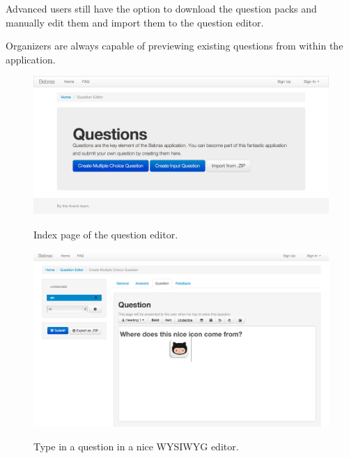 \begin{section}
\begin{subsection}
        Advanced users still have the option to download the question packs and manually
        edit them and import them to the question editor.
        
        Organizers are always capable of previewing existing questions from within the
        application.
        
        \begin{figure}[h!]
            \caption{Index page of the question editor.}
            \centering
            \includegraphics[width=1\textwidth]{img/index}
            \label{qe-index}
        \end{figure}
        
        \begin{figure}[h!]
            \caption{Type in a question in a nice WYSIWYG editor.}
            \centering
            \includegraphics[width=1\textwidth]{img/question}
            \label{qe-question}
        \end{figure}
        

\end{subsection}
\end{section}
